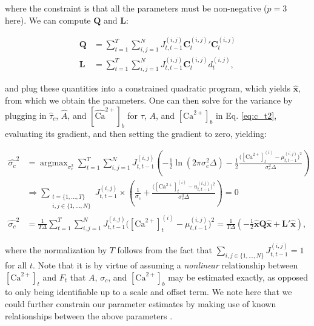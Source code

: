 \documentclass[10pt]{article}
\providecommand{\ve}[1]{\boldsymbol{#1}}
\providecommand{\ve}[1]{\boldsymbol{#1}}
\DeclareMathOperator*{\argmax}{argmax}
\newcommand{\Ca}{[\text{Ca}^{2+}]}
\newcommand{\wCab}{[\widehat{\text{Ca}}^{2+}]_b}
\begin{document}
\noindent where the constraint is that all the parameters must be non-negative ($p=3$ here). We can compute $\ve{Q}$ and $\ve{L}$:

\begin{align}
\ve{Q} &= \sum_{t=1}^T \sum_{i,j=1}^N J^{(i,j)}_{t,t-1}  {\ve{C}^{(i,j)}_t}' \ve{C}^{(i,j)}_t\\
\ve{L} &= \sum_{t=1}^T \sum_{i,j=1}^N J^{(i,j)}_{t,t-1} \ve{C}^{(i,j)}_t d^{(i,j)}_t,
\end{align}

\noindent and plug these quantities into a constrained quadratic program, which yields $\widehat{\ve{x}}$, from which we obtain the parameters.  One can then solve for the variance by plugging in $\widehat{\tau}_c$, $\widehat{A}$, and $\wCab$  for $\tau$, $A$,  and $\Ca_b$ in Eq. \ref{eq:c_t2}, evaluating its gradient, and then setting the gradient to zero, yielding:

\begin{subequations}
\begin{align}
\widehat{\sigma_c}^2 &= \argmax_{\sigma_c^2} \sum_{t=1}^T \sum_{i,j=1}^N J^{(i,j)}_{t,t-1}  \left( -\frac{1}{2} \ln (2 \pi \sigma_c^2 \Delta) - \frac{1}{2} \frac{\big(\Ca_t^{(i)} - \mu_{t,t-1}^{(i,j)}\big)^2}{\sigma_c^2 \Delta}\right)
\\ &\Rightarrow \sum_{\substack{t=\{1,\ldots,T\} \\ i,j \in \{1,\ldots,N\}}} J^{(i,j)}_{t,t-1} \times \left( \frac{1}{\sigma_c} + \frac{\big(\Ca_t^{(i)} -u_{t,t-1}^{(i,j)}\big)^2}{\sigma_c^3 \Delta}\right) = 0
\\ \widehat{\sigma_c}^2 &= \frac{1}{T \Delta}\sum_{t=1}^T \sum_{i,j=1}^N J^{(i,j)}_{t,t-1} \big(\Ca_t^{(i)}- \mu_{t,t-1}^{(i,j)}\big)^2= \frac{1}{T \Delta} \left(-\frac{1}{2}\widehat{\ve{x}} \ve{Q} \widehat{\ve{x}} + \ve{L}' \widehat{\ve{x}}\right), \label{eq:sig}
\end{align}
\end{subequations}

\noindent where the normalization by $T$ follows from the fact that $\sum_{i,j \in \{1,\ldots,N\}} J^{(i,j)}_{t,t-1}=1$ for all  $t$. Note that it is by virtue of assuming a \emph{nonlinear} relationship between $\Ca_t$ and $F_t$ that $A$, $\sigma_c$, and $\Ca_b$ may be estimated exactly, as opposed to only being identifiable up to a scale and offset term. We note here that we could further constrain our parameter estimates by making use of known relationships between the above parameters \cite{ImagingManual}. 
\end{document}
